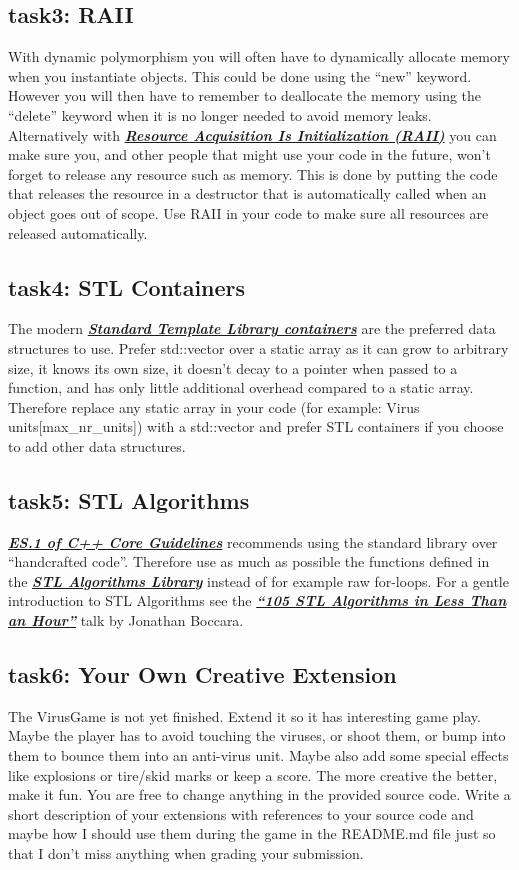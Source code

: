 \documentclass[12pt]{article}
\newcommand*{\link}[2]{\href{#1}{\color{blue}\textbf{\textit{#2}}}}
\begin{document}
\subsection{task3: RAII}
With dynamic polymorphism you will often have to dynamically allocate
memory when you instantiate objects. This could be done using the
``new'' keyword. However you will then have to remember to deallocate
the memory using the ``delete'' keyword when it is no longer needed to
avoid memory leaks. Alternatively with
\link{https://en.cppreference.com/w/cpp/language/raii}{Resource
  Acquisition Is Initialization (RAII)} you can make sure you, and
other people that might use your code in the future, won't forget to
release any resource such as memory. This is done by putting the code
that releases the resource in a destructor that is automatically
called when an object goes out of scope. Use RAII in your code to make
sure all resources are released automatically.

\subsection{task4: STL Containers}
The modern \link{http://www.cplusplus.com/reference/stl/}{Standard
  Template Library containers} are the preferred data structures to
use. Prefer std::vector over a static array as it can grow to
arbitrary size, it knows its own size, it doesn't decay to a pointer when
passed to a function, and has only little additional overhead compared
to a static array. Therefore replace any static array in your code
(for example: Virus units[max\_nr\_units]) with a std::vector and
prefer STL containers if you choose to add other data structures.

\subsection{task5: STL Algorithms}
\link{https://isocpp.github.io/CppCoreGuidelines/CppCoreGuidelines\#Res-lib}
{ES.1 of C++ Core Guidelines} recommends using the standard library
over ``handcrafted code''.  Therefore use as much as possible the
functions defined in the
\link{https://en.cppreference.com/w/cpp/algorithm} {STL Algorithms
  Library} instead of for example raw for-loops. For a gentle
introduction to STL Algorithms see the
\link{https://www.youtube.com/watch?v=2olsGf6JIkU} {``105 STL
  Algorithms in Less Than an Hour''} talk by Jonathan Boccara.

\subsection{task6: Your Own Creative Extension}
The VirusGame is not yet finished. Extend it so it has interesting
game play. Maybe the player has to avoid touching the viruses, or
shoot them, or bump into them to bounce them into an anti-virus
unit. Maybe also add some special effects like explosions or tire/skid
marks or keep a score. The more creative the better, make it fun. You
are free to change anything in the provided source code. Write a short
description of your extensions with references to your source code and
maybe how I should use them during the game in the README.md file just
so that I don't miss anything when grading your submission.
\end{document}
